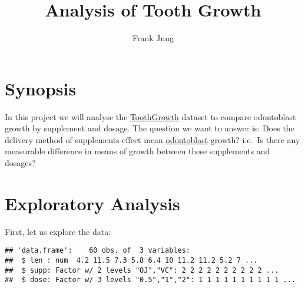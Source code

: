 \documentclass[legalpaper]{article}
\title{Analysis of Tooth Growth}
\author{Frank Jung}
\date{}
\newenvironment{Shaded}{\begin{snugshade}}{\end{snugshade}}
\newcommand{\KeywordTok}[1]{\textcolor[rgb]{0.13,0.29,0.53}{\textbf{{#1}}}}
\newcommand{\StringTok}[1]{\textcolor[rgb]{0.31,0.60,0.02}{{#1}}}
\newcommand{\CommentTok}[1]{\textcolor[rgb]{0.56,0.35,0.01}{\textit{{#1}}}}
\newcommand{\NormalTok}[1]{{#1}}
\begin{document}
\maketitle


{
\hypersetup{linkcolor=black}
\setcounter{tocdepth}{2}
\tableofcontents
}
\section{Synopsis}\label{synopsis}

In this project we will analyse the
\href{https://stat.ethz.ch/R-manual/R-devel/library/datasets/html/ToothGrowth.html}{ToothGrowth}
dataset to compare odontoblast growth by supplement and dosage. The
question we want to answer is: Does the delivery method of supplements
effect mean
\href{https://en.wikipedia.org/wiki/Odontoblast}{odontoblast} growth?
i.e.~Is there any measurable difference in means of growth between these
supplements and dosages?

\section{Exploratory Analysis}\label{exploratory-analysis}

First, let us explore the data:

\begin{Shaded}
\end{Shaded}

\begin{verbatim}
## 'data.frame':    60 obs. of  3 variables:
##  $ len : num  4.2 11.5 7.3 5.8 6.4 10 11.2 11.2 5.2 7 ...
##  $ supp: Factor w/ 2 levels "OJ","VC": 2 2 2 2 2 2 2 2 2 2 ...
##  $ dose: Factor w/ 3 levels "0.5","1","2": 1 1 1 1 1 1 1 1 1 1 ...
\end{verbatim}

\begin{Shaded}
\end{Shaded}
\end{document}
